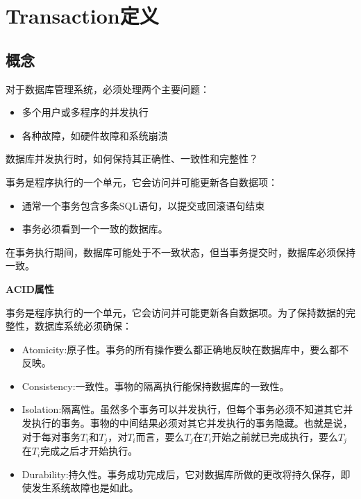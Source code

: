 \section{Transaction定义}

\subsection{概念}

对于数据库管理系统，必须处理两个主要问题：
\begin{itemize}
    \item 多个用户或多程序的并发执行
    \item 各种故障，如硬件故障和系统崩溃
\end{itemize}

数据库并发执行时，如何保持其正确性、一致性和完整性？

事务是程序执行的一个单元，它会访问并可能更新各自数据项：
\begin{itemize}
    \item 通常一个事务包含多条SQL语句，以提交或回滚语句结束
    \item 事务必须看到一个一致的数据库。
\end{itemize}

在事务执行期间，数据库可能处于不一致状态，但当事务提交时，数据库必须保持一致。

\noindent\textbf{ACID属性}

事务是程序执行的一个单元，它会访问并可能更新各自数据项。为了保持数据的完整性，数据库系统必须确保：
\begin{itemize}
    \item Atomicity:原子性。事务的所有操作要么都正确地反映在数据库中，要么都不反映。
    \item Consistency:一致性。事物的隔离执行能保持数据库的一致性。
    \item Isolation:隔离性。虽然多个事务可以并发执行，但每个事务必须不知道其它并发执行的事务。事物的中间结果必须对其它并发执行的事务隐藏。也就是说，对于每对事务$T_i$和$T_j$，对$T_i$而言，要么$T_j$在$T_i$开始之前就已完成执行，要么$T_j$在$T_i$完成之后才开始执行。
    \item Durability:持久性。事务成功完成后，它对数据库所做的更改将持久保存，即使发生系统故障也是如此。
\end{itemize}
